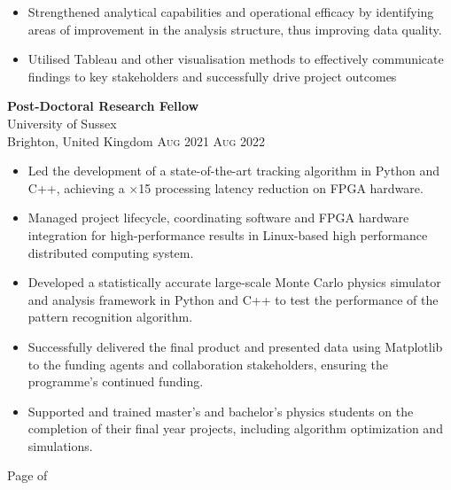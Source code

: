 \documentclass[oneside]{article}
\newcommand{\empitem}[7]{
        {\large \textbf{#1}} \\
        {{\fontseries{medium}\selectfont #2}}\\
        {{\fontseries{light}\selectfont #3}} \hfill
        {\scshape\fontseries{light}\selectfont\footnotesize #4 \textendash{} #5 #6} 
        #7
}
\begin{document}
{\begin{minipage}[t][\dimexpr\textheight-2\fboxrule-2\fboxsep\relax][t]{\dimexpr0.6\textwidth-2\fboxrule-2\fboxsep\relax}
{\begin{itemize}
            \item Strengthened analytical capabilities and operational efficacy by identifying areas of improvement in the analysis structure, thus improving data quality.
            \item Utilised Tableau and other visualisation methods to effectively communicate findings to key stakeholders and successfully drive project outcomes
        \end{itemize}
        }
%
        \empitem{Post-Doctoral Research Fellow}
        {University of Sussex}
        {Brighton, United Kingdom}
        {Aug 2021}
        {Aug 2022}
        {}
        {
        \begin{itemize}
            \setlength{\itemsep}{-3pt}
            \item Led the development of a state-of-the-art tracking algorithm in Python and C++, achieving a $\times$15 processing latency reduction on FPGA hardware.%
            \item Managed project lifecycle, coordinating software and FPGA hardware integration for high-performance results in Linux-based high performance distributed computing system.
            \item Developed a statistically accurate large-scale Monte Carlo physics simulator and analysis framework in Python and C++ to test the performance of the pattern recognition algorithm.
            \item Successfully delivered the final product and presented data using Matplotlib to the funding agents and collaboration stakeholders, ensuring the programme's continued funding.
            \item Supported and trained master's and bachelor's physics students on the completion of their final year projects, including algorithm optimization and simulations.
        \end{itemize}
        }
        \vfill%
        {\hfill\small{}\selectfont Page \thepage of \pageref{LastPage}\hfill}
    \end{minipage}
}

\newpage
\end{document}
